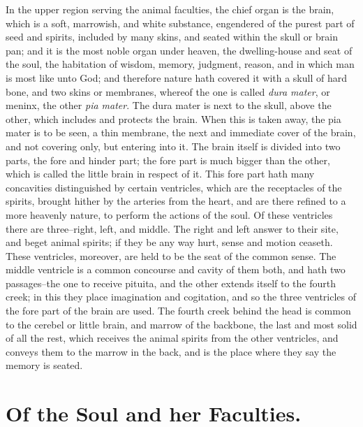 In the upper region serving the animal faculties, the chief organ is the brain,
which is a soft, marrowish, and white substance, engendered of the purest part
of seed and spirits, included by many skins, and seated within the skull or
brain pan; and it is the most noble organ under heaven, the dwelling-house and
seat of the soul, the habitation of wisdom, memory, judgment, reason, and in
which man is most like unto God; and therefore nature hath covered it with a
skull of hard bone, and two skins or membranes, whereof the one is called
\emph{dura mater}, or meninx, the other \emph{pia mater}. The dura mater is
next to the skull, above the other, which includes and protects the brain. When
this is taken away, the pia mater is to be seen, a thin membrane, the next and
immediate cover of the brain, and not covering only, but entering into it. The
brain itself is divided into two parts, the fore and hinder part; the fore part
is much bigger than the other, which is called the little brain in respect of
it. This fore part hath many concavities distinguished by certain ventricles,
which are the receptacles of the spirits, brought hither by the arteries from
the heart, and are there refined to a more heavenly nature, to perform the
actions of the soul. Of these ventricles there are three--right, left, and
middle. The right and left answer to their site, and beget animal spirits; if
they be any way hurt, sense and motion ceaseth. These ventricles, moreover, are
held to be the seat of the common sense. The middle ventricle is a common
concourse and cavity of them both, and hath two passages--the one to receive
pituita, and the other extends itself to the fourth creek; in this they place
imagination and cogitation, and so the three ventricles of the fore part of the
brain are used. The fourth creek behind the head is common to the cerebel or
little brain, and marrow of the backbone, the last and most solid of all the
rest, which receives the animal spirits from the other ventricles, and conveys
them to the marrow in the back, and is the place where they say the memory is
seated.

\section{Of the Soul and her Faculties.}


